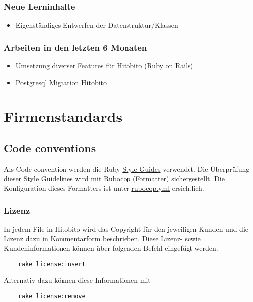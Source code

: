 \subsection{Neue Lerninhalte}

\begin{itemize}
    \item Eigenständiges Entwerfen der Datenstruktur/Klassen
\end{itemize}

\subsection{Arbeiten in den letzten 6 Monaten}

\begin{itemize}
    \item Umsetzung diverser Features für Hitobito (Ruby on Rails)
    \item Postgresql Migration Hitobito
\end{itemize}

\chapter{Firmenstandards}

\section{Code conventions}
Als Code convention werden die Ruby \href{https://github.com/rubocop/ruby-style-guide}{Style Guides} verwendet. 
Die Überprüfung dieser Style Guidelines wird mit Rubocop (Formatter) sichergestellt. Die Konfiguration
dieses Formatters ist unter \href{https://github.com/hitobito/hitobito/blob/master/.rubocop.yml}{rubocop.yml} ersichtlich.

\subsection{Lizenz}
In jedem File in Hitobito wird das Copyright für den jeweiligen Kunden und die Lizenz dazu
in Kommentarform beschrieben. Diese Lizenz- sowie Kundeninformationen können über folgenden Befehl 
eingefügt werden.

\begin{verbatim}
    rake license:insert
\end{verbatim}
    
Alternativ dazu können diese Informationen mit 

\begin{verbatim}
    rake license:remove 
\end{verbatim}


